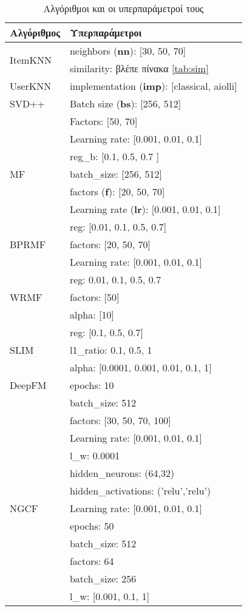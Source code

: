 \begin{table}[H]
	\centering
	\caption {Αλγόριθμοι και οι υπερπαράμετροί τους} \label{tab:alg_hyper} 
	\begin{tabular}{| l | l |}
		
		\hline
		\textbf{Αλγόριθμος} & \textbf{Υπερπαράμετροι} \\
		\hline	
	     \multirow{2}{*}{ItemKNN}  & neighbors (\textbf{nn}): [30, 50, 70] \\ 
		 & similarity: βλέπε πίνακα \ref{tab:sim} \\ \cline{1-1}
		 UserKNN       &  implementation (\textbf{imp}): [classical, aiolli]\\
		\hline
		SVD++ & Batch size (\textbf{bs}): [256, 512] \\
		&Factors: [50, 70]\\
		&Learning rate: [0.001, 0.01, 0.1]\\
		&reg\_b: [0.1, 0.5, 0.7 ]\\
		\hline
		MF	 & batch\_size: [256, 512] \\
		& factors (\textbf{f}): [20, 50, 70] \\
		& Learning rate (\textbf{lr}): [0.001, 0.01, 0.1]\\
		& reg: [0.01, 0.1, 0.5, 0.7]\\
		\hline
		BPRMF	& factors: [20, 50, 70] \\
		& Learning rate: [0.001, 0.01, 0.1] \\
		& reg: {0.01, 0.1, 0.5, 0.7}\\
		\hline
		WRMF &	factors: [50] \\
		& alpha: [10] \\
		& reg: [0.1,  0.5, 0.7] \\
		\hline
		SLIM &	l1\_ratio: {0.1, 0.5, 1} \\
		& alpha: [0.0001, 0.001, 0.01, 0.1, 1]\\
		\hline
		DeepFM	& epochs: 10 \\
		& batch\_size: 512 \\
		& factors: [30, 50, 70, 100] \\
		&Learning rate: [0.001, 0.01, 0.1] \\
		& l\_w: 0.0001 \\
		& hidden\_neurons: (64,32) \\
		& hidden\_activations: ('relu','relu')\\
		\hline
		NGCF & Learning rate: [0.001, 0.01, 0.1] \\
		& epochs: 50 \\
		& batch\_size: 512 \\
		& factors: 64 \\
		& batch\_size: 256 \\
		& l\_w: [0.001, 0.1, 1] \\
		\hline
	\end{tabular}
\end{table}
\newpage
